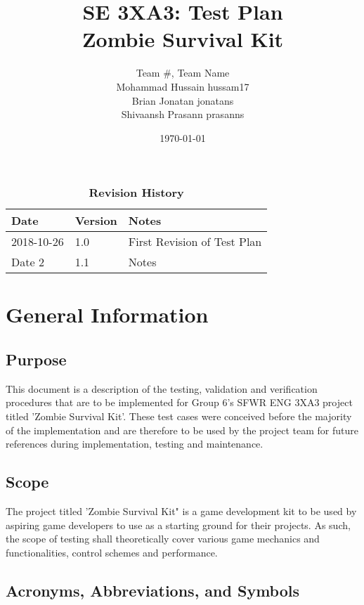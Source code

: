 \documentclass[12pt, titlepage]{article}
\title{SE 3XA3: Test Plan\\Zombie Survival Kit}
\author{Team \#, Team Name
		\\ Mohammad Hussain hussam17
		\\ Brian Jonatan jonatans
		\\ Shivaansh Prasann prasanns
}
\date{\today}
\begin{document}
\maketitle

\tableofcontents
\listoftables
\listoffigures

\begin{table}[bp]
\caption{\bf Revision History}
\begin{tabularx}{\textwidth}{p{3cm}p{2cm}X}
\toprule {\bf Date} & {\bf Version} & {\bf Notes}\\
\midrule
2018-10-26 & 1.0 & First Revision of Test Plan\\
Date 2 & 1.1 & Notes\\
\bottomrule
\end{tabularx}
\end{table}

\newpage




\section{General Information}

\subsection{Purpose}
This document is a description of the testing, validation and verification procedures that are to be implemented for Group 6's SFWR ENG 3XA3 project titled 'Zombie Survival Kit'. These test cases were conceived before the majority of the implementation and are therefore to be used by the project team for future references during implementation, testing and maintenance.
\subsection{Scope}
The project titled 'Zombie Survival Kit" is a game development kit to be used by aspiring game developers to use as a starting ground for their projects. As such, the scope of testing shall theoretically cover various game mechanics and functionalities, control schemes and performance.
\subsection{Acronyms, Abbreviations, and Symbols}
\end{document}
